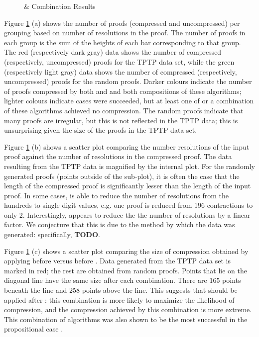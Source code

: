 {\begin{figure}[p]
 \caption{\GFOLU \& \FORPI Combination Results}
\label{fig:ex}

\end{figure}

Figure \ref{fig:ex} (a) shows the number of proofs (compressed and uncompressed) per grouping based on number of resolutions in the proof. The number of proofs in each group is the sum of the heights of each bar corresponding to that group. The red (respectively dark gray) data shows the number of compressed (respectively, uncompressed) proofs for the TPTP data set, while the green (respectively light gray) data shows the number of compressed (respectively, uncompressed) proofs for the random proofs. Darker colours indicate the number of proofs compressed by both {\FORPI} and {\GFOLU} and both compositions of these algorithms; lighter colours indicate cases were {\FORPI} succeeded, but at least one of {\GFOLU} or a combination of these algorithms achieved no compression. The random proofs indicate that many proofs are irregular, but this is not reflected in the TPTP data; this is unsurprising given the size of the proofs in the TPTP data set.

Figure \ref{fig:ex} (b) shows a scatter plot comparing the number resolutions of the input proof against the number of resolutions in the compressed proof. The data resulting from the TPTP data is magnified by the internal plot. For the randomly generated proofs (points outside of the sub-plot), it is often the case that the length of the compressed proof is significantly lesser than the length of the input proof. In some cases, {\FORPI} is able to reduce the number of resolutions from the hundreds to single digit values, e.g. one proof is reduced from 196 contractions to only 2. Interestingly, {\GFOLU} appears to reduce the the number of resolutions by a linear factor. We conjecture that this is due to the method by which the data was generated: specifically, {\bf TODO}.

Figure \ref{fig:ex} (c) shows a scatter plot comparing the size of compression obtained by applying {\FORPI} before {\GFOLU} versus {\GFOLU} before {\FORPI}. Data generated from the TPTP data set is marked in red; the rest are obtained from random proofs. Points that lie on the diagonal line have the same size after each combination. There are 165 points beneath the line and 258 points above the line. This suggests that {\FORPI} should be applied after {\GFOLU}: this combination is more likely to maximize the likelihood of compression, and the compression achieved by this combination is more extreme. This combination of algorithms was also shown to be the most successful in the propositional case \cite{LURPI}.

}

